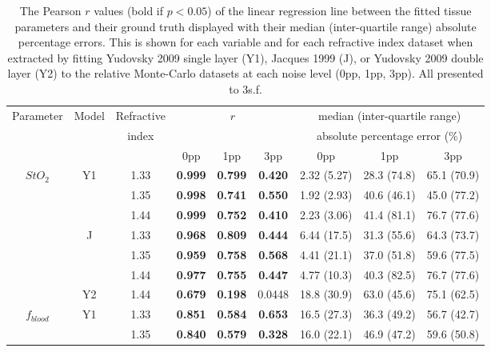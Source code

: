 \begin{subappendices}
\begin{table}[htb!]
    \centering
    \caption{The Pearson $r$ values (bold if $p<0.05$) of the linear regression line between the fitted tissue parameters and their ground truth displayed with their median (inter-quartile range) absolute percentage errors. This is shown for each variable and for each refractive index dataset when extracted by fitting Yudovsky 2009 single layer (Y1), Jacques 1999 (J), or Yudovsky 2009 double layer (Y2) to the relative Monte-Carlo datasets at each noise level (0pp, 1pp, 3pp). All presented to 3s.f.}
    \begin{tabular}{|ccc|ccc|ccc|}
        \hline
        Parameter & Model & Refractive & \multicolumn{3}{c}{$r$} & \multicolumn{3}{|c|}{median (inter-quartile range)} \\
        & & index & \multicolumn{3}{c}{} & \multicolumn{3}{|c|}{absolute percentage error (\%)} \\
        & & & 0pp & 1pp & 3pp & 0pp & 1pp & 3pp \\
        \hline
        \multirow{7}{*}{$StO_2$} & \multirow{3}{*}{Y1} & 1.33 & \textbf{0.999} & \textbf{0.799} & \textbf{0.420} & 2.32 (5.27) & 28.3 (74.8) & 65.1 (70.9) \\
        & & 1.35 & \textbf{0.998} & \textbf{0.741} & \textbf{0.550} & 1.92 (2.93) & 40.6 (46.1) & 45.0 (77.2) \\
        & & 1.44 & \textbf{0.999} & \textbf{0.752} & \textbf{0.410} & 2.23 (3.06) & 41.4 (81.1) & 76.7 (77.6) \\
        \cline{2-9}
        & \multirow{3}{*}{J} & 1.33 & \textbf{0.968} & \textbf{0.809} & \textbf{0.444} & 6.44 (17.5) & 31.3 (55.6) & 64.3 (73.7) \\
        & & 1.35 & \textbf{0.959} & \textbf{0.758} & \textbf{0.568} & 4.41 (21.1) & 37.0 (51.8) & 59.6 (77.5) \\
        & & 1.44 &  \textbf{0.977} & \textbf{0.755} & \textbf{0.447} & 4.77 (10.3) & 40.3 (82.5) & 76.7 (77.6) \\
        \cline{2-9}
        & Y2 & 1.44 & \textbf{0.679} & \textbf{0.198} & 0.0448 & 18.8 (30.9) & 63.0 (45.6) & 75.1 (62.5) \\
        \hline
        \multirow{7}{*}{$f_{blood}$} & \multirow{3}{*}{Y1} & 1.33 & \textbf{0.851} & \textbf{0.584} & \textbf{0.653} & 16.5 (27.3) & 36.3 (49.2) & 56.7 (42.7) \\
        & & 1.35 & \textbf{0.840} & \textbf{0.579} & \textbf{0.328} & 16.0 (22.1) & 46.9 (47.2) & 59.6 (50.8) \\

\end{tabular}
\end{table}
\end{subappendices}
